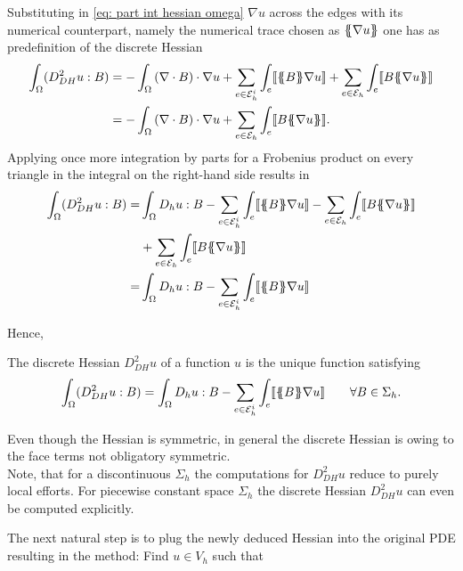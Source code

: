 Substituting in \eqref{eq: part int hessian omega} $\nabla u$ across the edges with its numerical counterpart, namely the numerical trace chosen as $\{\!\!\{ \nabla u \}\!\!\}$ one has as predefinition of the discrete Hessian
	\begin{align}
		\int_\Omega (D_{DH}^2 u : B) 
		&= - \int_\Omega \left(\nabla \cdot B\right) \cdot \nabla u
		+ \sum_{ e \in \edgesi} \int_e  \jump {\average B \nabla u } 
				+ \sum_{ e \in \edges} \int_e \jump {B \average {\nabla u} }  \nonumber \\
		&= - \int_\Omega \left(\nabla \cdot B\right) \cdot \nabla u
				+ \sum_{ e \in \edges} \int_e  \jump{B \average {\nabla u} }.	
	\end{align}
Applying once more integration by parts for a Frobenius product on every triangle in the integral on the right-hand side results in
	\begin{align}
		\int_\Omega (D_{DH}^2 u : B) 
		=& \int_\Omega D_h u: B 
			-\sum_{ e \in \edgesi} \int_e  \jump {\average B  \nabla u }
			- \sum_{ e \in \edges} \int_e \jump {B \average {\nabla u} }\nonumber \\		
			&+ \sum_{ e \in \edges} \int_e  \jump {B \average {\nabla u} }		\nonumber \\
		=& \int_\Omega D_h u: B -\sum_{ e \in \edgesi} \int_e  \jump {\average B  \nabla u }				
	\end{align}

Hence,
\begin{definition}
	The discrete Hessian $D_{DH}^2 u$ of a function $u$ is the unique function satisfying
	\begin{align}
		\int_\Omega (D_{DH}^2 u : B) 
		= \int_\Omega D_h u: B -\sum_{ e \in \mathcal{E}_h^i} \int_e  \llbracket \{\!\!\{ B \}\!\!\} \nabla u  \rrbracket\qquad \forall B \in \Sigma_h. \label{eq: discrete hessian}
	\end{align}
\end{definition}

Even though the Hessian is symmetric, in general the discrete Hessian is owing to the face terms not obligatory symmetric. \\
Note, that for a discontinuous $\Sigma_h$ the computations for $D_{DH}^2 u$ reduce to purely local efforts. For piecewise constant space $\Sigma_h$ the discrete Hessian $D_{DH}^2 u$ can even be computed explicitly.

The next natural step is to plug the newly deduced Hessian into the original \MA PDE resulting in the method: Find $u \in V_h$ such that

